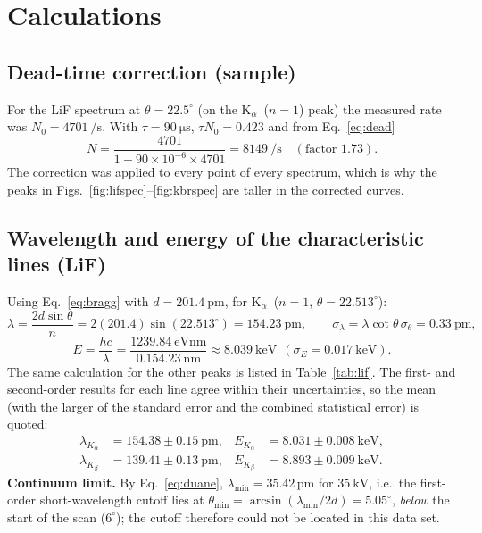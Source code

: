 \documentclass[11pt,a4paper]{article}
\newcommand{\Ka}{K$_\alpha$}
\begin{document}
\section{Calculations}

\subsection{Dead-time correction (sample)}
For the LiF spectrum at $\theta=22.5^\circ$ (on the \Ka\ ($n=1$) peak) the measured rate was $N_0=4701\ \si{\per\second}$. With $\tau=\SI{90}{\micro\second}$, $\tau N_0=0.423$ and from Eq.~\eqref{eq:dead}
\[
N=\frac{4701}{1-90\times10^{-6}\times 4701}=8149\ \si{\per\second}\quad(\text{factor } 1.73).
\]
The correction was applied to every point of every spectrum, which is why the peaks in Figs.~\ref{fig:lifspec}--\ref{fig:kbrspec} are taller in the corrected curves.

\subsection{Wavelength and energy of the characteristic lines (LiF)}
\label{sec:calclif}
Using Eq.~\eqref{eq:bragg} with $d=\SI{201.4}{\pico\metre}$, for \Ka\ ($n=1$, $\theta=22.513^\circ$):
\[
\lambda=\frac{2d\sin\theta}{n}=2(201.4)\sin(22.513^\circ)=154.23\ \si{\pico\metre},
\qquad
\sigma_\lambda=\lambda\cot\theta\,\sigma_\theta=0.33\ \si{\pico\metre},
\]
\[
E=\frac{hc}{\lambda}=\frac{1239.84\ \si{\electronvolt\nano\metre}}{0.154.23\ \si{\nano\metre}}\approx 8.039\ \si{\kilo\electronvolt}\ \ (\sigma_E=0.017\ \si{\kilo\electronvolt}).
\]
The same calculation for the other peaks is listed in Table~\ref{tab:lif}. The first- and second-order results for each line agree within their uncertainties, so the mean (with the larger of the standard error and the combined statistical error) is quoted:
\begin{align*}
\lambda_{K_\alpha}&=154.38\pm0.15\ \si{\pico\metre},& E_{K_\alpha}&=8.031\pm0.008\ \si{\kilo\electronvolt},\\
\lambda_{K_\beta}&=139.41\pm0.13\ \si{\pico\metre},& E_{K_\beta}&=8.893\pm0.009\ \si{\kilo\electronvolt}.
\end{align*}
\textbf{Continuum limit.} By Eq.~\eqref{eq:duane}, $\lambda_{\min}=35.42$\,pm for $\SI{35}{\kilo\volt}$, i.e.\ the first-order short-wavelength cutoff lies at $\theta_{\min}=\arcsin(\lambda_{\min}/2d)=5.05^\circ$, \emph{below} the start of the scan ($6^\circ$); the cutoff therefore could not be located in this data set.
\end{document}
